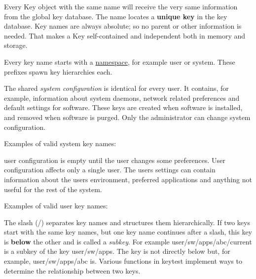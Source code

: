 Every {\ttfamily Key} object with the same name will receive the very same information from the global key database. The name locates a {\bfseries{unique key}} in the key database. Key names are always absolute; so no parent or other information is needed. That makes a {\ttfamily Key} self-\/contained and independent both in memory and storage.

Every key name starts with a \mbox{\hyperlink{doc_help_elektra-namespaces_md}{namespace}}, for example {\ttfamily user} or {\ttfamily system}. These prefixes spawn key hierarchies each.

The shared {\itshape system configuration} is identical for every user. It contains, for example, information about system daemons, network related preferences and default settings for software. These keys are created when software is installed, and removed when software is purged. Only the administrator can change system configuration.

Examples of valid system key names\+:


\begin{DoxyCode}{0}
\end{DoxyCode}


user configuration is empty until the user changes some preferences. User configuration affects only a single user. The user\textquotesingle{}s settings can contain information about the user\textquotesingle{}s environment, preferred applications and anything not useful for the rest of the system.

Examples of valid user key names\+:


\begin{DoxyCode}{0}
\end{DoxyCode}


The slash ({\ttfamily /}) separates key names and structures them hierarchically. If two keys start with the same key names, but one key name continues after a slash, this key is {\bfseries{below}} the other and is called a {\itshape subkey}. For example {\ttfamily user/sw/apps/abc/current} is a subkey of the key {\ttfamily user/sw/apps}. The key is not directly below but, for example, {\ttfamily user/sw/apps/abc} is. Various functions in {\ttfamily keytest} implement ways to determine the relationship between two keys.

